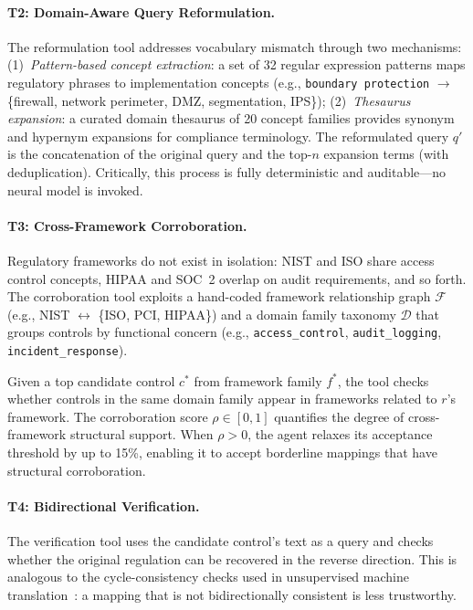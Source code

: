 \documentclass{sn-jnl}
\begin{document}
\paragraph{T2: Domain-Aware Query Reformulation.}
The reformulation tool addresses vocabulary mismatch through two mechanisms:
(1)~\emph{Pattern-based concept extraction}: a set of 32 regular expression patterns maps regulatory phrases to implementation concepts (e.g., \texttt{boundary protection} $\rightarrow$ \{firewall, network perimeter, DMZ, segmentation, IPS\});
(2)~\emph{Thesaurus expansion}: a curated domain thesaurus of 20 concept families provides synonym and hypernym expansions for compliance terminology.
The reformulated query $q'$ is the concatenation of the original query and the top-$n$ expansion terms (with deduplication).
Critically, this process is fully deterministic and auditable---no neural model is invoked.

\paragraph{T3: Cross-Framework Corroboration.}
Regulatory frameworks do not exist in isolation: NIST and ISO share access control concepts, HIPAA and SOC~2 overlap on audit requirements, and so forth.
The corroboration tool exploits a hand-coded framework relationship graph $\mathcal{F}$ (e.g., NIST $\leftrightarrow$ \{ISO, PCI, HIPAA\}) and a domain family taxonomy $\mathcal{D}$ that groups controls by functional concern (e.g., \texttt{access\_control}, \texttt{audit\_logging}, \texttt{incident\_response}).

Given a top candidate control $c^*$ from framework family $f^*$, the tool checks whether controls in the same domain family appear in frameworks related to $r$'s framework.
The corroboration score $\rho \in [0, 1]$ quantifies the degree of cross-framework structural support.
When $\rho > 0$, the agent relaxes its acceptance threshold by up to 15\%, enabling it to accept borderline mappings that have structural corroboration.

\paragraph{T4: Bidirectional Verification.}
The verification tool uses the candidate control's text as a query and checks whether the original regulation can be recovered in the reverse direction.
This is analogous to the cycle-consistency checks used in unsupervised machine translation~\cite{Lample2018}: a mapping that is not bidirectionally consistent is less trustworthy.
\end{document}
